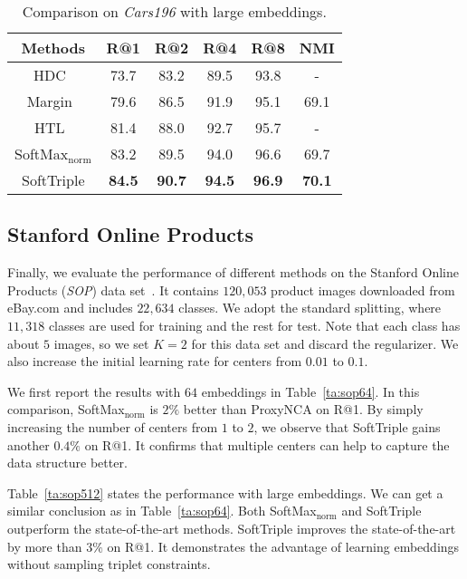 \documentclass[10pt,twocolumn,letterpaper]{article}
\begin{document}
\begin{table}[!ht]
\centering
\small
\caption{Comparison on \textit{Cars196} with large embeddings.}\label{ta:cars512}
\begin{tabular}{c|ccccc}
Methods&R@1&R@2&R@4&R@8&NMI\\\hline
HDC~\cite{YuanYZ17}&73.7&83.2&89.5&93.8&-\\
Margin~\cite{ManmathaWSK17}&79.6&86.5&91.9&95.1&69.1\\
HTL~\cite{GeHDS18}&81.4&88.0&92.7&95.7&-\\\hline
SoftMax$_{\mathrm{norm}}$&83.2&89.5&94.0&96.6&69.7\\
SoftTriple&\textbf{84.5}&\textbf{90.7}&\textbf{94.5}&\textbf{96.9}&\textbf{70.1}\\
\end{tabular}
\end{table}

\subsection{Stanford Online Products}

Finally, we evaluate the performance of different methods on the Stanford Online Products (\textit{SOP}) data set~\cite{SongXJS16}. It contains $120,053$ product images downloaded from eBay.com and includes $22,634$ classes. We adopt the standard splitting, where $11,318$ classes are used for training and the rest for test. Note that each class has about $5$ images, so we set $K=2$ for this data set and discard the regularizer. We also increase the initial learning rate for centers from $0.01$ to $0.1$.

We first report the results with $64$ embeddings in Table~\ref{ta:sop64}. In this comparison, SoftMax$_{\mathrm{norm}}$ is $2\%$ better than ProxyNCA on R@1. By simply increasing the number of centers from $1$ to $2$, we observe that SoftTriple gains another $0.4\%$ on R@1. It confirms that multiple centers can help to capture the data structure better. 

Table~\ref{ta:sop512} states the performance with large embeddings. We can get a similar conclusion as in Table~\ref{ta:sop64}. Both SoftMax$_{\mathrm{norm}}$ and SoftTriple outperform the state-of-the-art methods. SoftTriple improves the state-of-the-art by more than $3\%$ on R@1. It demonstrates the advantage of learning embeddings without sampling triplet constraints.
\end{document}
